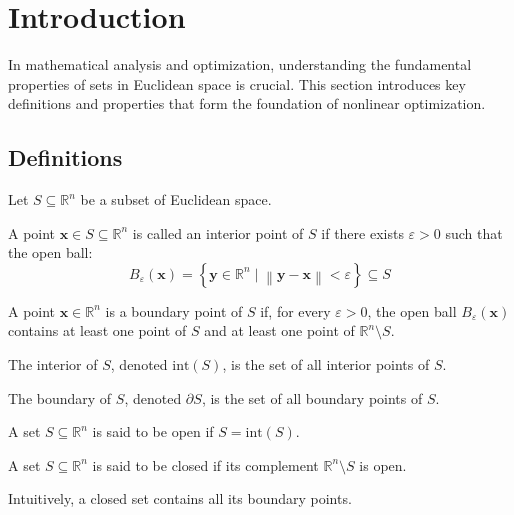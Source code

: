\section{Introduction}

In mathematical analysis and optimization, understanding the fundamental properties of sets in Euclidean space is crucial. 
This section introduces key definitions and properties that form the foundation of nonlinear optimization.

\subsection{Definitions}
Let $S \subseteq \mathbb{R}^n$ be a subset of Euclidean space.
\begin{definition}
    A point $\mathbf{x}\in S \subseteq\mathbb{R}^n$ is called an interior point of $S$ if there exists $\varepsilon>0$ such that the open ball:
    \[B_{\varepsilon}(\mathbf{x})=\left\{\mathbf{y}\in\mathbb{R}^n\mid\left\lVert \mathbf{y}-\mathbf{x}\right\rVert <\varepsilon\right\}\subseteq S\]
\end{definition}

\begin{definition}
    A point $\mathbf{x}\in\mathbb{R}^n$ is a boundary point of $S$ if, for every $\varepsilon > 0$, the open ball $B_{\varepsilon}(\mathbf{x})$ contains at least one point of $S$ and at least one point of $\mathbb{R}^n\setminus S$.
\end{definition}

\begin{definition}
    The interior of $S$, denoted $\text{int}(S)$, is the set of all interior points of $S$.
\end{definition}

\begin{definition}
    The boundary of $S$, denoted $\partial S$, is the set of all boundary points of $S$.
\end{definition}

\begin{definition}
    A set $S \subseteq \mathbb{R}^n$ is said to be open if $S = \text{int}(S)$.
\end{definition}

\begin{definition}
    A set $S \subseteq \mathbb{R}^n$ is said to be closed if its complement $\mathbb{R}^n \setminus S$ is open.
\end{definition}
\noindent Intuitively, a closed set contains all its boundary points.

